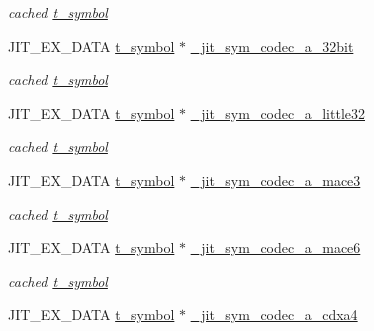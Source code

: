\begin{DoxyCompactItemize}
\begin{DoxyCompactList}\small\item\em cached \hyperlink{structt__symbol}{t\_\-symbol} \item\end{DoxyCompactList}\item 
\hypertarget{group__jitter_gac6b84a1712a543c8cdd29cabd161b99c}{
JIT\_\-EX\_\-DATA \hyperlink{structt__symbol}{t\_\-symbol} $\ast$ \hyperlink{group__jitter_gac6b84a1712a543c8cdd29cabd161b99c}{\_\-jit\_\-sym\_\-codec\_\-a\_\-32bit}}
\label{group__jitter_gac6b84a1712a543c8cdd29cabd161b99c}

\begin{DoxyCompactList}\small\item\em cached \hyperlink{structt__symbol}{t\_\-symbol} \item\end{DoxyCompactList}\item 
\hypertarget{group__jitter_ga4b0986e8916e25863c49991195ace09a}{
JIT\_\-EX\_\-DATA \hyperlink{structt__symbol}{t\_\-symbol} $\ast$ \hyperlink{group__jitter_ga4b0986e8916e25863c49991195ace09a}{\_\-jit\_\-sym\_\-codec\_\-a\_\-little32}}
\label{group__jitter_ga4b0986e8916e25863c49991195ace09a}

\begin{DoxyCompactList}\small\item\em cached \hyperlink{structt__symbol}{t\_\-symbol} \item\end{DoxyCompactList}\item 
\hypertarget{group__jitter_gaca8932ab7df65f0d42dc1c1b9815f1c5}{
JIT\_\-EX\_\-DATA \hyperlink{structt__symbol}{t\_\-symbol} $\ast$ \hyperlink{group__jitter_gaca8932ab7df65f0d42dc1c1b9815f1c5}{\_\-jit\_\-sym\_\-codec\_\-a\_\-mace3}}
\label{group__jitter_gaca8932ab7df65f0d42dc1c1b9815f1c5}

\begin{DoxyCompactList}\small\item\em cached \hyperlink{structt__symbol}{t\_\-symbol} \item\end{DoxyCompactList}\item 
\hypertarget{group__jitter_ga6418ed42d5a144534e4914f2bd51beb7}{
JIT\_\-EX\_\-DATA \hyperlink{structt__symbol}{t\_\-symbol} $\ast$ \hyperlink{group__jitter_ga6418ed42d5a144534e4914f2bd51beb7}{\_\-jit\_\-sym\_\-codec\_\-a\_\-mace6}}
\label{group__jitter_ga6418ed42d5a144534e4914f2bd51beb7}

\begin{DoxyCompactList}\small\item\em cached \hyperlink{structt__symbol}{t\_\-symbol} \item\end{DoxyCompactList}\item 
\hypertarget{group__jitter_gad515a4c6841f905b82935a0a95432224}{
JIT\_\-EX\_\-DATA \hyperlink{structt__symbol}{t\_\-symbol} $\ast$ \hyperlink{group__jitter_gad515a4c6841f905b82935a0a95432224}{\_\-jit\_\-sym\_\-codec\_\-a\_\-cdxa4}}
\label{group__jitter_gad515a4c6841f905b82935a0a95432224}


\end{DoxyCompactItemize}
